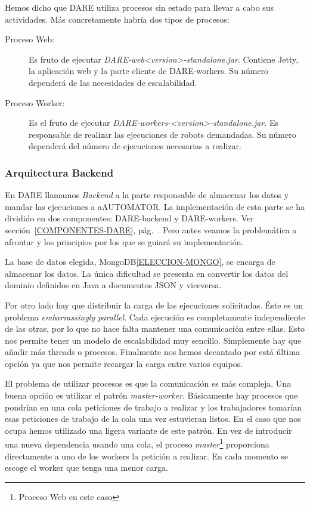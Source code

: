 Hemos dicho que DARE utiliza procesos sin estado para llevar a cabo
sus actividades. Más concretamente habría dos tipos de procesos:
\begin{description}
  \item[Proceso Web:] Es fruto de ejecutar
    \emph{DARE-web<version>-standalone.jar}. Contiene Jetty, la
    aplicación web y la parte cliente de DARE-workers. Su número
    dependerá de las necesidades de escalabilidad.
  \item[Proceso Worker:] Es el fruto de ejecutar
    \emph{DARE-workers-<version>-standalone.jar}. Es responsable de
    realizar las ejecuciones de robots demandadas. Su número dependerá
    del número de ejecuciones necesarias a realizar.
\end{description}

\subsubsection{Arquitectura Backend}

En DARE llamamos \emph{Backend} a la parte responsable de almacenar
los datos y mandar las ejecuciones a aAUTOMATOR. La implementación de
esta parte se ha dividido en dos componentes: DARE-backend y
DARE-workers. Ver sección~\ref{COMPONENTES-DARE},
pág.~\pageref{COMPONENTES-DARE}. Pero antes veamos la problemática a
afrontar y los principios por los que se guiará su implementación.

La base de datos elegida, MongoDB\ref{ELECCION-MONGO}, se encarga de
almacenar los datos. La única dificultad se presenta en convertir los
datos del dominio definidos en Java a documentos JSON y viceversa.

Por otro lado hay que distribuir la carga de las ejecuciones
solicitadas. Éste es un problema \emph{embarrassingly
  parallel}\cite{EMBARRASSINGLY-PARALLEL}. Cada ejecución es
completamente independiente de las otras, por lo que no hace falta
mantener una comunicación entre ellas. Esto nos permite tener un
modelo de escalabilidad muy sencillo. Simplemente hay que añadir más
threads o procesos. Finalmente nos hemos decantado por está última
opción ya que nos permite recargar la carga entre varios equipos.

El problema de utilizar procesos es que la comunicación es más
compleja. Una buena opción es utilizar el patrón
\emph{master-worker}\cite{MASTER-WORKER}. Básicamente hay procesos que
pondrían en una cola peticiones de trabajo a realizar y los
trabajadores tomarían esas peticiones de trabajo de la cola una vez
estuvieran listos. En el caso que nos ocupa hemos utilizado una ligera
variante de este patrón. En vez de introducir una nueva dependencia
usando una cola, el proceso \emph{master}\footnote{Proceso Web en este
  caso} proporciona directamente a uno de los workers la petición a
realizar. En cada momento se escoge el worker que tenga una menor
carga.

